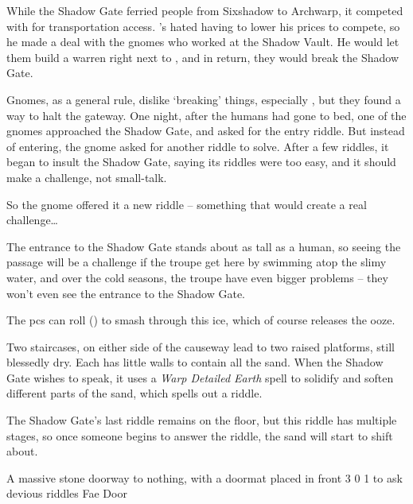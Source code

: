 \begin{multicols}{2}
\begin{exampletext}
  While the Shadow Gate ferried people from Sixshadow to Archwarp, it competed with  for transportation access.
  's  hated having to lower his prices to compete, so he made a deal with the gnomes who worked at the Shadow Vault.
  He would let them build a warren right next to , and in return, they would break the Shadow Gate.

  Gnomes, as a general rule, dislike `breaking' things, especially , but they found a way to halt the gateway.
  One night, after the humans had gone to bed, one of the gnomes approached the Shadow Gate, and asked for the entry riddle.
  But instead of entering, the gnome asked for another riddle to solve.
  After a few riddles, it began to insult the Shadow Gate, saying its riddles were too easy, and it should make a challenge, not small-talk.

  So the gnome offered it a new riddle -- something that would create a real challenge\ldots
\end{exampletext}

The entrance to the Shadow Gate stands about as tall as a human, so seeing the passage will be a challenge if the troupe get here by swimming atop the slimy water, and over the cold seasons, the troupe have even bigger problems -- they won't even see the entrance to the Shadow Gate.

The \glspl{pc} can roll  (\tn[10]) to smash through this ice, which of course releases the ooze.

Two staircases, on either side of the causeway lead to two raised platforms, still blessedly dry.
Each has little walls to contain all the sand.
When the Shadow Gate wishes to speak, it uses a \textit{Warp Detailed Earth} spell to solidify and soften different parts of the sand, which spells out a riddle.

The Shadow Gate's last riddle remains on the floor, but this riddle has multiple stages, so once someone begins to answer the riddle, the sand will start to shift about.

  {A massive stone doorway to nothing, with a doormat placed in front}%
  {3}%
  {0}%
  {1}%
  {to ask devious riddles}%
  {Fae Door}%
  {
    \setcounter{Fire}{2}
    \setcounter{Earth}{3}
    \setcounter{Water}{1}
    \setcounter{Academics}{2}
    \setcounter{Caving}{1}
    \setcounter{Xenomology}{1}
  }%


\end{multicols}
